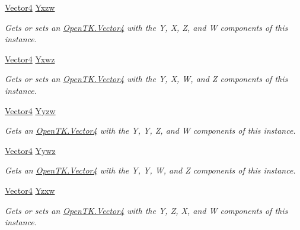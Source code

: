\begin{DoxyCompactItemize}
\hyperlink{struct_open_t_k_1_1_vector4}{Vector4} \hyperlink{struct_open_t_k_1_1_vector4_abb85791f07c957726ab2e9351851b8a1}{Yxzw}
\begin{DoxyCompactList}\small\item\em Gets or sets an \hyperlink{struct_open_t_k_1_1_vector4}{Open\-T\-K.\-Vector4} with the Y, X, Z, and W components of this instance. \end{DoxyCompactList}\item 
\hyperlink{struct_open_t_k_1_1_vector4}{Vector4} \hyperlink{struct_open_t_k_1_1_vector4_ab5204cd89bf9656f00868a6ed7be4d59}{Yxwz}
\begin{DoxyCompactList}\small\item\em Gets or sets an \hyperlink{struct_open_t_k_1_1_vector4}{Open\-T\-K.\-Vector4} with the Y, X, W, and Z components of this instance. \end{DoxyCompactList}\item 
\hyperlink{struct_open_t_k_1_1_vector4}{Vector4} \hyperlink{struct_open_t_k_1_1_vector4_a22ee2457a51a8b0e5239826ad15fc7a5}{Yyzw}
\begin{DoxyCompactList}\small\item\em Gets an \hyperlink{struct_open_t_k_1_1_vector4}{Open\-T\-K.\-Vector4} with the Y, Y, Z, and W components of this instance. \end{DoxyCompactList}\item 
\hyperlink{struct_open_t_k_1_1_vector4}{Vector4} \hyperlink{struct_open_t_k_1_1_vector4_a964adcf52ba8064c089af46176bbf562}{Yywz}
\begin{DoxyCompactList}\small\item\em Gets an \hyperlink{struct_open_t_k_1_1_vector4}{Open\-T\-K.\-Vector4} with the Y, Y, W, and Z components of this instance. \end{DoxyCompactList}\item 
\hyperlink{struct_open_t_k_1_1_vector4}{Vector4} \hyperlink{struct_open_t_k_1_1_vector4_a74f9723520cecef3af340f61f9259371}{Yzxw}
\begin{DoxyCompactList}\small\item\em Gets or sets an \hyperlink{struct_open_t_k_1_1_vector4}{Open\-T\-K.\-Vector4} with the Y, Z, X, and W components of this instance. \end{DoxyCompactList}\item 

\end{DoxyCompactItemize}

